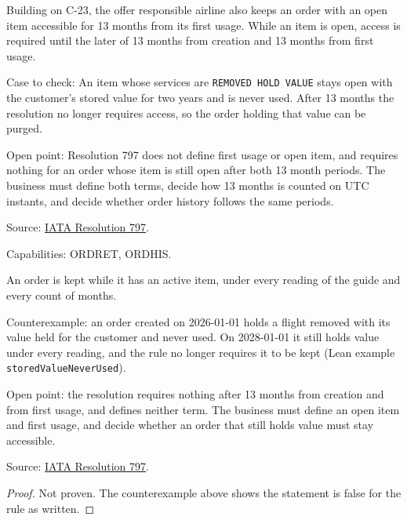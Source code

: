 \begin{definition}
  \label{def:order-creation-retention-first-usage}
  Building on C-23, the offer responsible airline also keeps an order with
  an open item accessible for 13 months from its first usage. While an item
  is open, access is required until the later of 13 months from creation and
  13 months from first usage.

  Case to check: An item whose services are \texttt{REMOVED HOLD VALUE}
  stays open with the customer's stored value for two years and is never
  used. After 13 months the resolution no longer requires access, so the
  order holding that value can be purged.

  Open point: Resolution 797 does not define first usage or open item, and
  requires nothing for an order whose item is still open after both 13 month
  periods. The business must define both terms, decide how 13 months is
  counted on UTC instants, and decide whether order history follows the same
  periods.

  Source: \href{https://www.iata.org/contentassets/72cbd60393ff42b5975d90ce9e049a7d/oneorder-resolution-797.pdf}{IATA Resolution 797}.

  Capabilities: ORDRET, ORDHIS.
\end{definition}

\begin{theorem}
  \label{thm:order-creation-keep-while-active}
  An order is kept while it has an active item, under every reading of the
  guide and every count of months.

  Counterexample: an order created on 2026-01-01 holds a flight removed with
  its value held for the customer and never used.  On 2028-01-01 it still
  holds value under every reading, and the rule no longer requires it to be
  kept (Lean example \texttt{storedValueNeverUsed}).

  Open point: the resolution requires nothing after 13 months from creation
  and from first usage, and defines neither term.  The business must define
  an open item and first usage, and decide whether an order that still holds
  value must stay accessible.

  Source: \href{https://www.iata.org/contentassets/72cbd60393ff42b5975d90ce9e049a7d/oneorder-resolution-797.pdf}{IATA Resolution 797}.
\end{theorem}
\begin{proof}
  Not proven.  The counterexample above shows the statement is false for the
  rule as written.
\end{proof}

